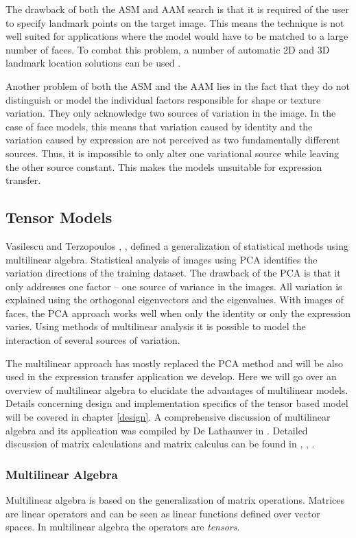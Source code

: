 \documentclass[11pt,a4paper,twoside]{report}
\begin{document}
The drawback of both the ASM and AAM search is that it is required of the user to specify
landmark points on the target image. This means the technique is not well suited
for applications where the model would have to be matched to a large number of
faces. To combat this problem, a number of automatic 2D and 3D landmark location
solutions can be used \cite{activeApp04}.

Another problem of both the ASM and the AAM lies in the fact that they do not
distinguish or model the individual factors responsible for shape or texture
variation. They only acknowledge two sources of variation in the image. In the
case of face models, this means that variation caused by
identity and the variation caused by expression are not perceived as two
fundamentally different sources. Thus, it is impossible to only alter one
variational source while leaving the other source constant. This makes the
models unsuitable for expression transfer.

\subsection{Tensor Models}
Vasilescu and Terzopoulos \cite{Ter1}, \cite{Ter2}, \cite{Ter3} defined a
generalization of statistical methods using multilinear algebra. Statistical
analysis of images using PCA identifies the variation directions of the training
dataset. The drawback of the PCA is that it only addresses one factor -- one
source of variance in the images. All variation is explained using the
orthogonal eigenvectors and the eigenvalues. With images of faces, the PCA
approach works well when only the identity or only the expression varies. Using
methods of multilinear analysis it is possible to model the interaction of
several sources of variation.

The multilinear approach has mostly replaced the PCA method and will be also used in the
expression transfer application we develop. Here we will go over an overview of
multilinear algebra to elucidate the advantages of multilinear
models. Details concerning design and implementation specifics of the tensor
based model will be covered
in chapter \ref{design}. A comprehensive discussion of multilinear algebra and
its application was compiled by De Lathauwer in \cite{multilinear}. Detailed
discussion of matrix calculations and matrix calculus can be found in \cite{matcalc}, \cite{matrix}, \cite{kronecker}.

\subsubsection{Multilinear Algebra}
Multilinear algebra is based on the generalization of matrix
operations. Matrices are linear operators and can be seen as linear functions
defined over vector spaces. In multilinear algebra the operators are
\textit{tensors}. 
\end{document}
